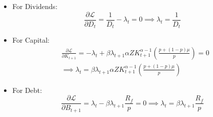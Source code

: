 \documentclass[12pt]{report}
\begin{document}
\begin{itemize}
    \item For Dividends:
    \begin{equation}
        \frac{\partial \mathcal{L}}{\partial D_t} = \frac{1}{D_t} - \lambda_t = 0 \implies \lambda_t = \frac{1}{D_t}
    \end{equation}
    \item For Capital:
    \begin{align}
        &\frac{\partial \mathcal{L}}{\partial K_{t+1}} = -\lambda_t + \beta \lambda_{t+1} \alpha Z K_{t+1}^{\alpha-1} 
        \left(\frac{p+(1-p)\mu}{p}\right) = 0 \\
        & \implies \lambda_t = \beta \lambda_{t+1} \alpha Z K_{t+1}^{\alpha-1} \left(\frac{p+(1-p)\mu}{p}\right)
    \end{align}
    \item For Debt:
    \begin{equation}
        \frac{\partial \mathcal{L}}{\partial B_{t+1}} = \lambda_t - \beta \lambda_{t+1} \frac{R_f}{p}= 0 \implies \lambda_t = \beta \lambda_{t+1} \frac{R_f}{p}
    \end{equation}
\end{itemize}
\appendix





 
\end{document}
